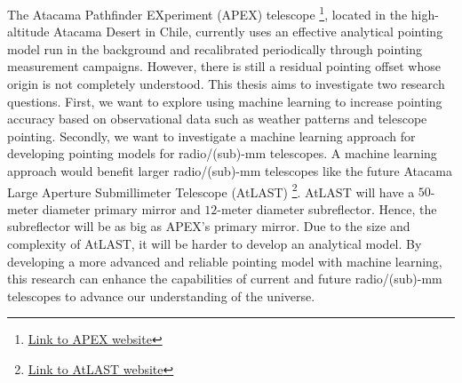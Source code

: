 The Atacama Pathfinder EXperiment (APEX) telescope \footnote[1]{\href{http://www.apex-telescope.org/ns/}{Link to APEX website}}, located in the high-altitude Atacama Desert in Chile,
currently uses an effective analytical pointing model run in the background and recalibrated periodically through pointing measurement campaigns.
However, there is still a residual pointing offset whose origin is not completely understood.
This thesis aims to investigate two research questions.
First, we want to explore using machine learning to increase pointing accuracy based on observational data such as weather patterns and telescope pointing.
Secondly, we want to investigate a machine learning approach for developing pointing models for radio/(sub)-mm telescopes.
A machine learning approach would benefit larger radio/(sub)-mm telescopes like the future Atacama Large Aperture Submillimeter Telescope (AtLAST)
\footnote[2]{\href{https://www.atlast.uio.no/}{Link to AtLAST website}}.
AtLAST will have a $50$-meter diameter primary mirror and $12$-meter diameter subreflector. Hence, the subreflector will be as big as APEX's primary mirror.
Due to the size and complexity of AtLAST, it will be harder to develop an analytical model.
By developing a more advanced and reliable pointing model with machine learning,
this research can enhance the capabilities of current and future radio/(sub)-mm telescopes to advance our understanding of the universe.


